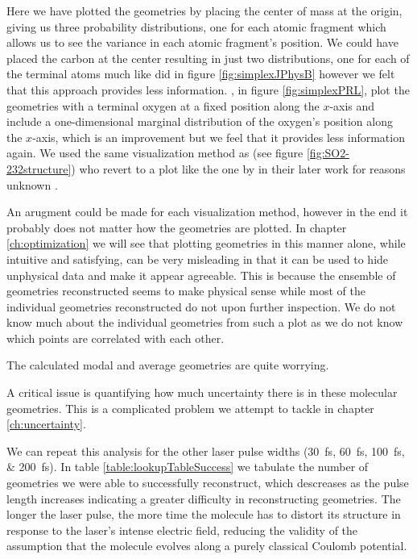 Here we have plotted the geometries by placing the center of mass at the origin, giving us three probability distributions, one for each atomic fragment which allows us to see the variance in each atomic fragment's position. We could have placed the carbon at the center resulting in just two distributions, one for each of the terminal atoms much like \citet{Brichta07} did in figure \ref{fig:simplexJPhysB} however we felt that this approach provides less information. \cite{Bocharova11}, in figure \ref{fig:simplexPRL}, plot the geometries with a terminal oxygen at a fixed position along the $x$-axis and include a one-dimensional marginal distribution of the oxygen's position along the $x$-axis, which is an improvement but we feel that it provides less information again.  We used the same visualization method as \citet{Legare05structure} (see figure \ref{fig:SO2-232structure}) who revert to a plot like the one by \citet{Bocharova11} in their later work for reasons unknown \citep{Legare05dynamics}.

An arugment could be made for each visualization method, however in the end it probably does not matter how the geometries are plotted. In chapter \ref{ch:optimization} we will see that plotting geometries in this manner alone, while intuitive and satisfying, can be very misleading in that it can be used to hide unphysical data and make it appear agreeable. This is because the ensemble of geometries reconstructed seems to make physical sense while most of the individual geometries reconstructed do not upon further inspection. We do not know much about the individual geometries from such a plot as we do not know which points are correlated with each other.

The calculated modal and average geometries are quite worrying. %

A critical issue is quantifying how much uncertainty there is in these molecular geometries. This is a complicated problem we attempt to tackle in chapter \ref{ch:uncertainty}.

We can repeat this analysis for the other laser pulse widths (\SIlist{30;60;100;200}{\fs}). In table \ref{table:lookupTableSuccess} we tabulate the number of geometries we were able to successfully reconstruct, which descreases as the pulse length increases indicating a greater difficulty in reconstructing geometries. The longer the laser pulse, the more time the molecule has to distort its structure in response to the laser's intense electric field, reducing the validity of the assumption that the molecule evolves along a purely classical Coulomb potential.

